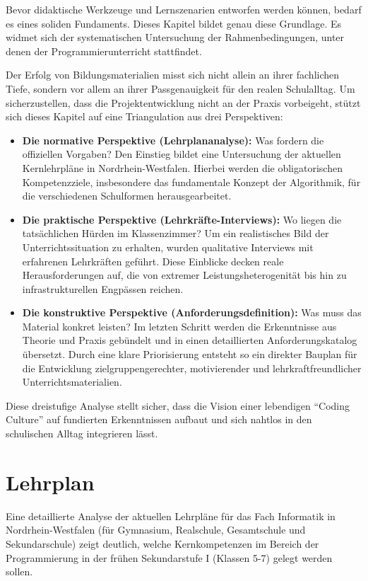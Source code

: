 \documentclass[a5paper,pagesize,10pt,bibtotoc,pointlessnumbers,
normalheadings,DIV=9,twoside=false]{scrbook}
\begin{document}
Bevor didaktische Werkzeuge und Lernszenarien entworfen werden können, bedarf es eines soliden Fundaments. Dieses Kapitel bildet genau diese Grundlage. Es widmet sich der systematischen Untersuchung der Rahmenbedingungen, unter denen der Programmierunterricht stattfindet.

Der Erfolg von Bildungsmaterialien misst sich nicht allein an ihrer fachlichen Tiefe, sondern vor allem an ihrer Passgenauigkeit für den realen Schulalltag. Um sicherzustellen, dass die Projektentwicklung nicht an der Praxis vorbeigeht, stützt sich dieses Kapitel auf eine Triangulation aus drei Perspektiven:

\begin{itemize}
    \item \textbf{Die normative Perspektive (Lehrplananalyse):} Was fordern die offiziellen Vorgaben? Den Einstieg bildet eine Untersuchung der aktuellen Kernlehrpläne in Nordrhein-Westfalen. Hierbei werden die obligatorischen Kompetenzziele, insbesondere das fundamentale Konzept der Algorithmik, für die verschiedenen Schulformen herausgearbeitet.
    \item \textbf{Die praktische Perspektive (Lehrkräfte-Interviews):} Wo liegen die tatsächlichen Hürden im Klassenzimmer? Um ein realistisches Bild der Unterrichtssituation zu erhalten, wurden qualitative Interviews mit erfahrenen Lehrkräften geführt. Diese Einblicke decken reale Herausforderungen auf, die von extremer Leistungsheterogenität bis hin zu infrastrukturellen Engpässen reichen.
    \item \textbf{Die konstruktive Perspektive (Anforderungsdefinition):} Was muss das Material konkret leisten? Im letzten Schritt werden die Erkenntnisse aus Theorie und Praxis gebündelt und in einen detaillierten Anforderungskatalog übersetzt. Durch eine klare Priorisierung entsteht so ein direkter Bauplan für die Entwicklung zielgruppengerechter, motivierender und lehrkraftfreundlicher Unterrichtsmaterialien.
\end{itemize}

Diese dreistufige Analyse stellt sicher, dass die Vision einer lebendigen ``Coding Culture'' auf fundierten Erkenntnissen aufbaut und sich nahtlos in den schulischen Alltag integrieren lässt.

\section*{Lehrplan}

Eine detaillierte Analyse der aktuellen Lehrpläne für das Fach Informatik in Nordrhein-Westfalen (für Gymnasium, Realschule, Gesamtschule und Sekundarschule) zeigt deutlich, welche Kernkompetenzen im Bereich der Programmierung in der frühen Sekundarstufe I (Klassen 5-7) gelegt werden sollen.
\end{document}
